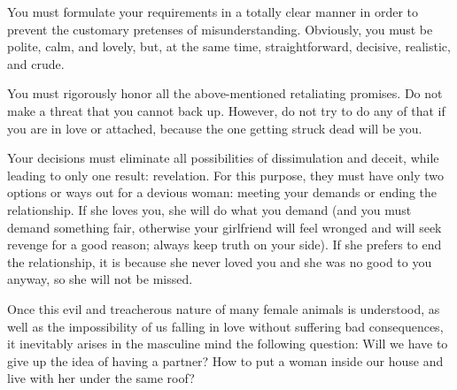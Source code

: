 
\par You must formulate your requirements in a totally clear manner in order to prevent the customary pretenses of misunderstanding. Obviously, you must be polite, calm, and lovely, but, at the same time, straightforward, decisive, realistic, and crude.

\par You must rigorously honor all the above-mentioned retaliating promises. Do not make a threat that you cannot back up. However, do not try to do any of that if you are in love or attached, because the one getting struck dead will be you.

\par Your decisions must eliminate all possibilities of dissimulation and deceit, while leading to only one result: revelation. For this purpose, they must have only two options or ways out for a devious woman: meeting your demands or ending the relationship. If she loves you, she will do what you demand (and you must demand something fair, otherwise your girlfriend will feel wronged and will seek revenge for a good reason; always keep truth on your side). If she prefers to end the relationship, it is because she never loved you and she was no good to you anyway, so she will not be missed.

\par Once this evil and treacherous nature of many female animals is understood, as well as the impossibility of us falling in love without suffering bad consequences, it inevitably arises in the masculine mind the following question: Will we have to give up the idea of having a partner? How to put a woman inside our house and live with her under the same roof?

